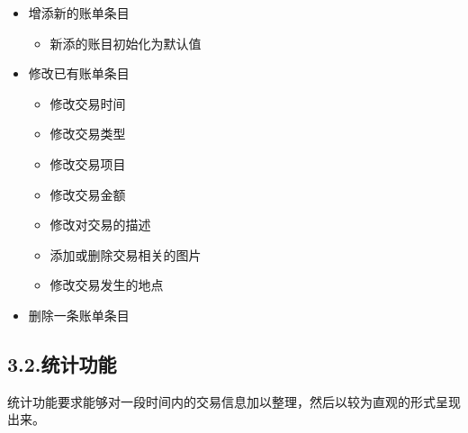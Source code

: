 \documentclass{article}
\begin{document}
\begin{itemize}[noitemsep,topsep=\mdcompacttopsep]%

\item{}增添新的账单条目

\begin{itemize}[noitemsep,topsep=\mdcompacttopsep]%

\item{}新添的账目初始化为默认值%
\end{itemize}%

\item{}修改已有账单条目

\begin{itemize}[noitemsep,topsep=\mdcompacttopsep]%

\item{}修改交易时间%

\item{}修改交易类型%

\item{}修改交易项目%

\item{}修改交易金额%

\item{}修改对交易的描述%

\item{}添加或删除交易相关的图片%

\item{}修改交易发生的地点%
\end{itemize}%

\item{}删除一条账单条目%
\end{itemize}%

\subsection{3.2.\hspace*{0.5em}统计功能}\label{section}%

\noindent{}统计功能要求能够对一段时间内的交易信息加以整理，然后以较为直观的形式呈现出来。%
\end{document}
